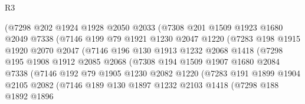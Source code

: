 \begin{lexlean}{R3}
\begin{coremodule}
                    (@7298
                      @202
                      @1924
                      @1928
                      @2050
                      @2033
                      (@7308
                        @201
                        @1509
                        @1923
                        @1680
                        @2049
                        @7338
                        (@7146
                          @199
                          @79
                          @1921
                          @1230
                          @2047
                          @1220
                          (@7283
                            @198
                            @1915
                            @1920
                            @2070
                            @2047
                            (@7146
                              @196
                              @130
                              @1913
                              @1232
                              @2068
                              @1418
                              (@7298
                                @195
                                @1908
                                @1912
                                @2085
                                @2068
                                (@7308
                                  @194
                                  @1509
                                  @1907
                                  @1680
                                  @2084
                                  @7338
                                  (@7146
                                    @192
                                    @79
                                    @1905
                                    @1230
                                    @2082
                                    @1220
                                    (@7283
                                      @191
                                      @1899
                                      @1904
                                      @2105
                                      @2082
                                      (@7146
                                        @189
                                        @130
                                        @1897
                                        @1232
                                        @2103
                                        @1418
                                        (@7298
                                          @188
                                          @1892
                                          @1896

\end{coremodule}
\end{lexlean}
